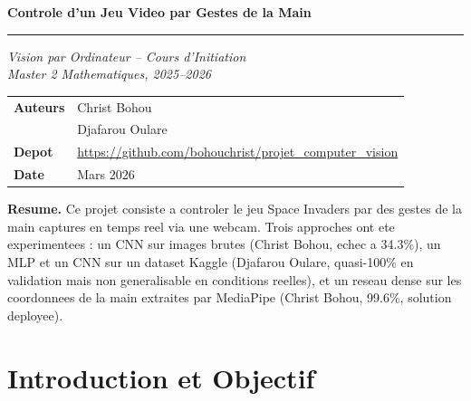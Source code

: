\documentclass[12pt,a4paper]{article}
\begin{document}

\begin{titlepage}
\centering\vspace*{1cm}
{\Huge\bfseries\color{NavyBlue}
Controle d'un Jeu Video par Gestes de la Main\par}
\vspace{0.6cm}\rule{0.6\linewidth}{1.5pt}\vspace{0.4cm}
{\large\itshape
Vision par Ordinateur -- Cours d'Initiation\\
Master 2 Mathematiques, 2025--2026\par}
\vspace{1cm}
\vspace{1.2cm}
{\large\begin{tabular}{ll}
\textbf{Auteurs} & Christ Bohou \\
                 & Djafarou Oulare \\[0.5em]
\textbf{Depot}   & \url{https://github.com/bohouchrist/projet_computer_vision}\\[0.5em]
\textbf{Date}    & Mars 2026
\end{tabular}\par}
\vfill
\begin{tcolorbox}[colback=gray!5,colframe=gray!30,width=0.92\linewidth]
\small\textbf{Resume.}
Ce projet consiste a controler le jeu Space Invaders par des gestes
de la main captures en temps reel via une webcam.
Trois approches ont ete experimentees :
un CNN sur images brutes (Christ Bohou, echec a 34.3\%),
un MLP et un CNN sur un dataset Kaggle (Djafarou Oulare, quasi-100\% en validation
mais non generalisable en conditions reelles),
et un reseau dense sur les coordonnees de la main extraites par MediaPipe
(Christ Bohou, 99.6\%, solution deployee).
\end{tcolorbox}
\end{titlepage}

\tableofcontents
\newpage

\section{Introduction et Objectif}
\end{document}
